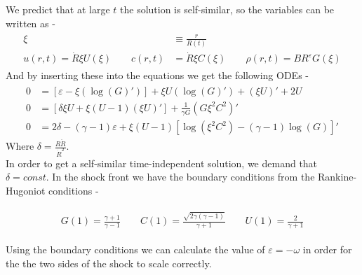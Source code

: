 \documentclass{article}
\begin{document}
We predict that at large $t$ the solution is self-similar, so the variables can be written as -
\begin{align}
    \begin{split}
        \xi &\equiv \frac{r}{R\left(t\right)}\\
        u\left(r,t\right)	=\dot{R}\xi U\left(\xi\right) \quad \quad
        c\left(r,t\right)	&=\dot{R}\xi C\left(\xi\right) \quad \quad
        \rho\left(r,t\right)	=BR^{\varepsilon}G\left(\xi\right)
    \end{split}
\end{align}
And by inserting these into the equations we get the following ODEs -
\begin{align}
    \begin{split}
        0 &= \left[\varepsilon-\xi\left(\log\left(G\right)'\right)\right]+\xi U\left(\log\left(G\right)'\right)+\left(\xi U\right)'+2U	\\
        0 &= \left[\delta\xi U+\xi\left(U-1\right)\left(\xi U\right)'\right]+\frac{1}{\gamma G}\left(G\xi^{2}C^{2}\right)'	\\
        0 &= 2\delta-\left(\gamma-1\right)\varepsilon+\xi\left(U-1\right)\left[\log\left(\xi^{2}C^{2}\right)-\left(\gamma-1\right)\log\left(G\right)\right]'
    \end{split}
\end{align}
Where $\delta = \frac{R\ddot{R}}{\dot{R}^{2}}$.\\
In order to get a self-similar time-independent solution, we demand that $\delta = const$. 
In the shock front we have the boundary conditions from the Rankine-Hugoniot conditions -

\begin{align}
    \begin{split}
        G\left(1\right)	=\frac{\gamma+1}{\gamma-1} \quad \quad
        C\left(1\right)	=\frac{\sqrt{2\gamma\left(\gamma-1\right)}}{\gamma+1} \quad \quad
        U\left(1\right)	=\frac{2}{\gamma+1}
    \end{split}
\end{align}

Using the boundary conditions we can calculate the value of $\varepsilon = - \omega$ in order for the the two sides of the shock to scale correctly.\\
\end{document}
